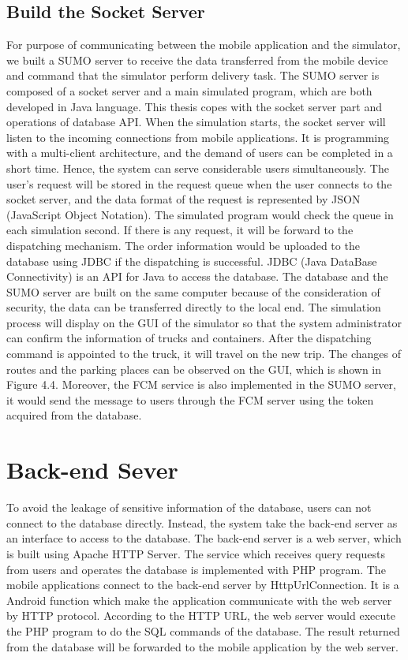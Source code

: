 \documentclass[12pt]{ksthesis}
\begin{document}
\begin{thesis}
{\subsection{Build the Socket Server}
For purpose of communicating between the mobile application and the simulator, we built a SUMO server to receive the data transferred from the mobile device and command that the simulator perform delivery task. The SUMO server is composed of a socket server and a main simulated program, which are both developed in Java language. This thesis copes with the socket server part and operations of database API.
When the simulation starts, the socket server will listen to the incoming connections from mobile applications. It is programming with a multi-client architecture, and the demand of users can be completed in a short time. Hence, the system can serve considerable users simultaneously. The user’s request will be stored in the request queue when the user connects to the socket server, and the data format of the request is represented by JSON (JavaScript Object Notation). The simulated program would check the queue in each simulation second. If there is any request, it will be forward to the dispatching mechanism. The order information would be uploaded to the database using JDBC if the dispatching is successful. JDBC (Java DataBase Connectivity) is an API for Java to access the database. The database and the SUMO server are built on the same computer because of the consideration of security, the data can be transferred directly to the local end. The simulation process will display on the GUI of the simulator so that the system administrator can confirm the information of trucks and containers. After the dispatching command is appointed to the truck, it will travel on the new trip. The changes of routes and the parking places can be observed on the GUI, which is shown in Figure 4.4. Moreover, the FCM service is also implemented in the SUMO server, it would send the message to users through the FCM server using the token acquired from the database.

\section{Back-end Sever}
To avoid the leakage of sensitive information of the database, users can not connect to the database directly. Instead, the system take the back-end server as an interface to access to the database. The back-end server is a web server, which is built using Apache HTTP Server. The service which receives query requests from users and operates the database is implemented with PHP program. 
The mobile applications connect to the back-end server by HttpUrlConnection. It is a Android function which make the application communicate with the web server by HTTP protocol. According to the HTTP URL, the web server would execute the PHP program to do the SQL commands of the database. The result returned from the database will be forwarded to the mobile application by the web server. 

}
\end{thesis}
\end{document}

